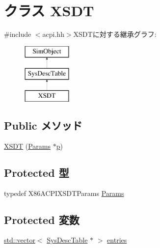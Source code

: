 \hypertarget{classX86ISA_1_1ACPI_1_1XSDT}{
\section{クラス XSDT}
\label{classX86ISA_1_1ACPI_1_1XSDT}
}


{\ttfamily \#include $<$acpi.hh$>$}XSDTに対する継承グラフ:\begin{figure}[H]
\begin{center}
\leavevmode
\includegraphics[height=3cm]{classX86ISA_1_1ACPI_1_1XSDT}
\end{center}
\end{figure}
\subsection*{Public メソッド}
\begin{DoxyCompactItemize}
\item 
\hyperlink{classX86ISA_1_1ACPI_1_1XSDT_a6d563b71af01c70e7e54fe470895e93f}{XSDT} (\hyperlink{classX86ISA_1_1ACPI_1_1XSDT_aeeb796d6a93a3929cdfc26a772c5cf1a}{Params} $\ast$\hyperlink{namespaceX86ISA_af675c1d542a25b96e11164b80809a856}{p})
\end{DoxyCompactItemize}
\subsection*{Protected 型}
\begin{DoxyCompactItemize}
\item 
typedef X86ACPIXSDTParams \hyperlink{classX86ISA_1_1ACPI_1_1XSDT_aeeb796d6a93a3929cdfc26a772c5cf1a}{Params}
\end{DoxyCompactItemize}
\subsection*{Protected 変数}
\begin{DoxyCompactItemize}
\item 
\hyperlink{classstd_1_1vector}{std::vector}$<$ \hyperlink{classX86ISA_1_1ACPI_1_1SysDescTable}{SysDescTable} $\ast$ $>$ \hyperlink{classX86ISA_1_1ACPI_1_1XSDT_aff927a83490471e964eaa7934ab31edf}{entries}
\end{DoxyCompactItemize}


